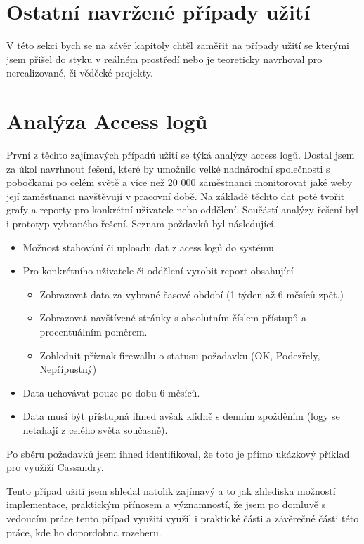 \documentclass[thesis=M,czech]{FITthesis}[2012/06/26]
\begin{document}
\section{Ostatní navržené případy užití}

V této sekci bych se na závěr kapitoly chtěl zaměřit na případy užití se kterými jsem přišel do styku v reálném prostředí nebo je teoreticky navrhoval pro nerealizované, či věděcké projekty. 

\section{Analýza Access logů}
První z těchto zajímavých případů užití se týká analýzy access logů. Dostal jsem za úkol navrhnout řešení, které by umožnilo velké nadnárodní společnosti s pobočkami po celém světě a více než 20 000 zaměstnanci monitorovat jaké weby její zaměstnanci navštěvují v pracovní době. Na základě těchto dat poté tvořit grafy a reporty pro konkrétní uživatele nebo oddělení. Součástí analýzy řešení byl i prototyp vybraného řešení. Seznam poždavků byl následující. 

\begin{itemize}
\item Možnost stahování či uploadu dat z acess logů do systému
\item Pro konkrétního uživatele či oddělení vyrobit report obsahující
\begin{itemize}
\item Zobrazovat data za vybrané časové období (1 týden až 6 měsíců zpět.) 
\item Zobrazovat navštívené stránky s absolutním číslem přístupů a procentuálním poměrem. 
\item Zohlednit příznak firewallu o statusu požadavku (OK, Podezřely, Nepřípustný)  
\end{itemize}
\item Data uchovávat pouze po dobu 6 měsíců. 
\item Data musí být přístupná ihned avšak klidně s denním zpožděním (logy se netahají z celého světa současně). 
\end{itemize}

Po sběru požadavků jsem ihned identifikoval, že toto je přímo ukázkový příklad pro využiží Cassandry. 

Tento případ užití jsem shledal natolik zajímavý a to jak zhlediska možností implementace, praktickým přínosem a významností, že jsem po domluvě s vedoucím práce tento případ využití využil i praktické části a závěrečné části této práce, kde ho dopordobna rozeberu.
\end{document}
